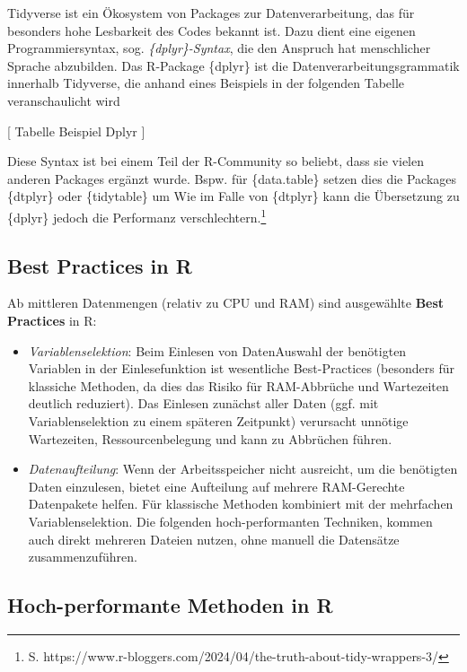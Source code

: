 \documentclass[
  german,
  10pt,
  twoside]{article}
\providecommand{\tightlist}{%
  \setlength{\itemsep}{0pt}\setlength{\parskip}{0pt}}
\begin{document}
Tidyverse ist ein Ökosystem von Packages zur Datenverarbeitung, das für
besonders hohe Lesbarkeit des Codes bekannt ist. Dazu dient eine eigenen
Programmiersyntax, sog. \emph{\{dplyr\}-Syntax}, die den Anspruch hat
menschlicher Sprache abzubilden. Das R-Package \{dplyr\} ist die
Datenverarbeitungsgrammatik innerhalb Tidyverse, die anhand eines
Beispiels in der folgenden Tabelle veranschaulicht wird

{[} Tabelle Beispiel Dplyr {]}

Diese Syntax ist bei einem Teil der R-Community so beliebt, dass sie
vielen anderen Packages ergänzt wurde. Bspw. für \{data.table\} setzen
dies die Packages \{dtplyr\} oder \{tidytable\} um Wie im Falle von
\{dtplyr\} kann die Übersetzung zu \{dplyr\} jedoch die Performanz
verschlechtern.\footnote{S.
  https://www.r-bloggers.com/2024/04/the-truth-about-tidy-wrappers-3/}

\subsection{Best Practices in R}\label{best-practices-in-r}

Ab mittleren Datenmengen (relativ zu CPU und RAM) sind ausgewählte
\textbf{Best Practices} in R:

\begin{itemize}
\tightlist
\item
  \emph{Variablenselektion}: Beim Einlesen von DatenAuswahl der
  benötigten Variablen in der Einlesefunktion ist wesentliche
  Best-Practices (besonders für klassiche Methoden, da dies das Risiko
  für RAM-Abbrüche und Wartezeiten deutlich reduziert). Das Einlesen
  zunächst aller Daten (ggf. mit Variablenselektion zu einem späteren
  Zeitpunkt) verursacht unnötige Wartezeiten, Ressourcenbelegung und
  kann zu Abbrüchen führen.
\item
  \emph{Datenaufteilung}: Wenn der Arbeitsspeicher nicht ausreicht, um
  die benötigten Daten einzulesen, bietet eine Aufteilung auf mehrere
  RAM-Gerechte Datenpakete helfen. Für klassische Methoden kombiniert
  mit der mehrfachen Variablenselektion. Die folgenden hoch-performanten
  Techniken, kommen auch direkt mehreren Dateien nutzen, ohne manuell
  die Datensätze zusammenzuführen.
\end{itemize}

\subsection{Hoch-performante Methoden in R}\label{sec-highperf}
\end{document}
